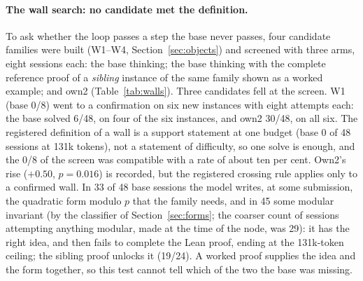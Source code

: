 \documentclass[11pt]{article}
\begin{document}
\paragraph{The wall search: no candidate met the definition.} To ask whether the loop
passes a step the base never passes, four candidate families were built
(W1--W4, Section~\ref{sec:objects}) and screened with three arms, eight
sessions each: the base thinking; the base thinking with the complete
reference proof of a \emph{sibling} instance of the same family shown as a
worked example; and own2 (Table~\ref{tab:walls}). Three candidates fell at
the screen. W1 (base 0/8) went to a confirmation on six new instances with
eight attempts each: the base solved 6/48, on four of the six instances,
and own2 30/48, on all six. The registered definition of a wall is a
support statement at one budget (base 0 of 48 sessions at 131k tokens),
not a statement of difficulty, so one solve is enough, and the 0/8 of the
screen was compatible with a rate of about ten per cent. Own2's rise
($+0.50$, $p=0.016$) is recorded, but the registered crossing rule applies
only to a confirmed wall. In 33 of 48 base sessions the model writes, at
some submission, the quadratic form modulo $p$ that the family needs, and
in 45 some modular invariant (by the classifier of
Section~\ref{sec:forms}; the coarser count of sessions attempting anything
modular, made at the time of the node, was 29): it has the right idea, and
then fails to complete the Lean proof, ending at the 131k-token ceiling;
the sibling proof unlocks it (19/24). A worked proof supplies the idea and the form together, so this test cannot tell which of the two the base was missing.

\begin{table}[!htbp]
\centering\footnotesize

\caption{The wall search: screen (eight sessions per candidate and arm) and the confirmation of the one candidate (six new instances; base and own2 $\times 8$, base with the sibling proof $\times 4$, template adapter $\times 4$, cut short at 18 sessions by the automatic removal deadline of the rented instance). Secondary contrasts only: the registered rule was the wall definition.}
\label{tab:walls}
\end{table}
\end{document}
